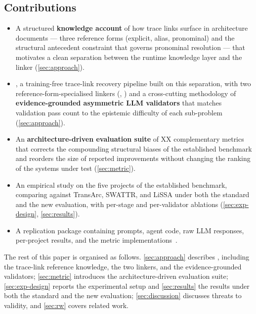 \subsection*{Contributions}
\begin{itemize}[leftmargin=*]
    \item A structured \textbf{knowledge account} of how trace links surface in architecture documents --- three reference forms (explicit, alias, pronominal) and the structural antecedent constraint that governs pronominal resolution --- that motivates a clean separation between the runtime knowledge layer and the linker (\autoref{sec:approach}).
    \item \textbf{\approach}, a training-free trace-link recovery pipeline built on this separation, with two reference-form-specialised linkers (\linkerB, \linkerC) and a cross-cutting methodology of \textbf{evidence-grounded asymmetric \ac{LLM} validators} that matches validation pass count to the epistemic difficulty of each sub-problem (\autoref{sec:approach}).
    \item An \textbf{architecture-driven evaluation suite} of XX complementary metrics that corrects the compounding structural biases of the established benchmark and reorders the size of reported improvements without changing the ranking of the systems under test (\autoref{sec:metric}).
    \item An empirical study on the five projects of the established benchmark, comparing \approach against TransArc, SWATTR, and LiSSA under both the standard and the new evaluation, with per-stage and per-validator ablations (\autoref{sec:exp-design}, \autoref{sec:results}).
    \item A replication package containing prompts, agent code, raw \ac{LLM} responses, per-project results, and the metric implementations~\cite{replication}.
\end{itemize}

The rest of this paper is organised as follows.
\autoref{sec:approach} describes \approach, including the trace-link reference knowledge, the two linkers, and the evidence-grounded validators; \autoref{sec:metric} introduces the architecture-driven evaluation suite; \autoref{sec:exp-design} reports the experimental setup and \autoref{sec:results} the results under both the standard and the new evaluation; \autoref{sec:discussion} discusses threats to validity, and \autoref{sec:rw} covers related work.

